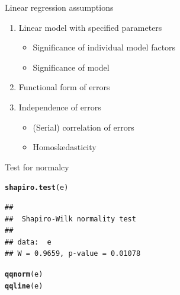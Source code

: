 \documentclass[xcolor=dvipsnames]{beamer}\usepackage{graphicx, color}
\makeatletter
\newcommand{\hlfunctioncall}[1]{\textcolor[rgb]{0.501960784313725,0,0.329411764705882}{\textbf{#1}}}%
\newenvironment{kframe}{%
 \def\at@end@of@kframe{}%
 \ifinner\ifhmode%
  \def\at@end@of@kframe{\end{minipage}}%
  \begin{minipage}{\columnwidth}%
 \fi\fi%
 \def\FrameCommand##1{\hskip\@totalleftmargin \hskip-\fboxsep
 \colorbox{shadecolor}{##1}\hskip-\fboxsep
     \hskip-\linewidth \hskip-\@totalleftmargin \hskip\columnwidth}%
 \MakeFramed {\advance\hsize-\width
   \@totalleftmargin\z@ \linewidth\hsize
   \@setminipage}}%
 {\par\unskip\endMakeFramed%
 \at@end@of@kframe}
\newenvironment{knitrout}{}{} %
\makeatother
\begin{document}
\begin{frame}[fragile]{Linear regression assumptions}
  \begin{enumerate}
    \item Linear model with specified parameters
      \begin{itemize}
        \item Significance of individual model factors
        \item Significance of model
      \end{itemize}
    \item \color{blue} Functional form of errors
    \item \color{black} Independence of errors
      \begin{itemize}
        \item (Serial) correlation of errors
        \item Homoskedasticity
      \end{itemize}
  \end{enumerate}
\end{frame}

\begin{frame}[fragile]{Test for normalcy}
\begin{knitrout}
\color{fgcolor}\begin{kframe}
\begin{alltt}
\hlfunctioncall{shapiro.test}(e)
\end{alltt}
\begin{verbatim}
## 
## 	Shapiro-Wilk normality test
## 
## data:  e
## W = 0.9659, p-value = 0.01078
\end{verbatim}
\end{kframe}
\end{knitrout}

\begin{knitrout}
\color{fgcolor}\begin{kframe}
\begin{alltt}
\hlfunctioncall{qqnorm}(e)
\hlfunctioncall{qqline}(e)
\end{alltt}
\end{kframe}
\end{knitrout}

\end{frame}
\end{document}
